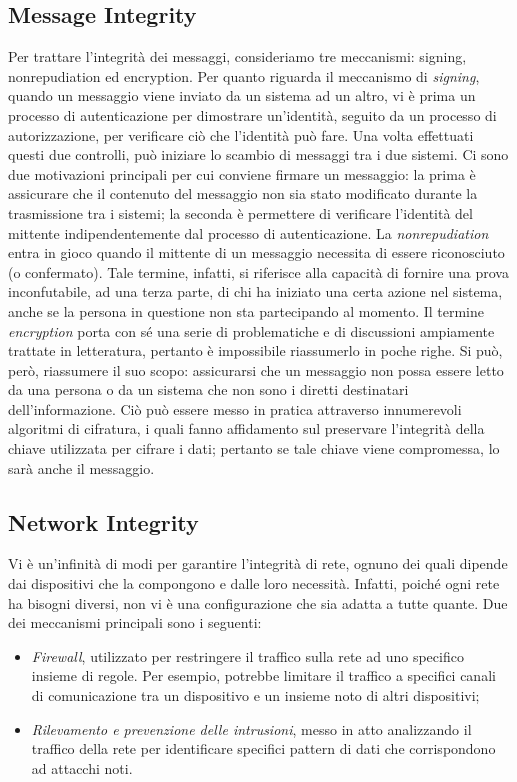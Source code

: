 \subsection{Message Integrity}
Per trattare l'integrità dei messaggi, consideriamo tre meccanismi: signing, nonrepudiation ed encryption. \newline
Per quanto riguarda il meccanismo di \textit{signing}, quando un messaggio viene inviato da un sistema ad un altro, vi è prima un processo di autenticazione per dimostrare un'identità, seguito da un processo di autorizzazione, per verificare ciò che l'identità può fare. Una volta effettuati questi due controlli, può iniziare lo scambio di messaggi tra i due sistemi. Ci sono due motivazioni principali per cui conviene firmare un messaggio: la prima è assicurare che il contenuto del messaggio non sia stato modificato durante la trasmissione tra i sistemi; la seconda è permettere di verificare l'identità del mittente indipendentemente dal processo di autenticazione. \newline
La \textit{nonrepudiation} entra in gioco quando il mittente di un messaggio necessita di essere riconosciuto (o confermato). Tale termine, infatti, si riferisce alla capacità di fornire una prova inconfutabile, ad una terza parte, di chi ha iniziato una certa azione nel sistema, anche se la persona in questione non sta partecipando al momento. \newline
Il termine \textit{encryption} porta con sé una serie di problematiche e di discussioni ampiamente trattate in letteratura, pertanto è impossibile riassumerlo in poche righe. Si può, però, riassumere il suo scopo: assicurarsi che un messaggio non possa essere letto da una persona o da un sistema che non sono i diretti destinatari dell'informazione. Ciò può essere messo in pratica attraverso innumerevoli algoritmi di cifratura, i quali fanno affidamento sul preservare l'integrità della chiave utilizzata per cifrare i dati; pertanto se tale chiave viene compromessa, lo sarà anche il messaggio. 

\subsection{Network Integrity}
Vi è un'infinità di modi per garantire l'integrità di rete, ognuno dei quali dipende dai dispositivi che la compongono e dalle loro necessità. Infatti, poiché ogni rete ha bisogni diversi, non vi è una configurazione che sia adatta a tutte quante.
\newline Due dei meccanismi principali sono i seguenti:
\begin{itemize}
\item \textit{Firewall}, utilizzato per restringere il traffico sulla rete ad uno specifico insieme di regole. Per esempio, potrebbe limitare il traffico a specifici canali di comunicazione tra un dispositivo e un insieme noto di altri dispositivi;
\item \textit{Rilevamento e prevenzione delle intrusioni}, messo in atto analizzando il traffico della rete per identificare specifici pattern di dati che corrispondono ad attacchi noti.
\end{itemize}

